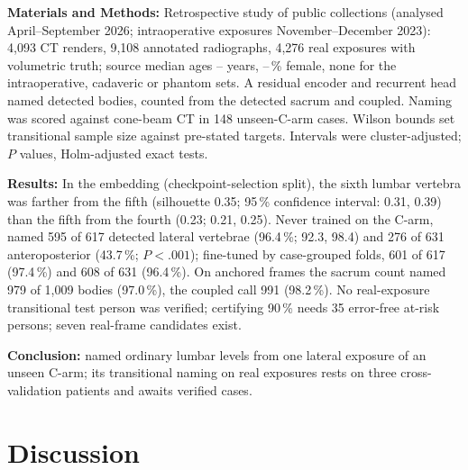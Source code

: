 \textbf{Materials and Methods:} Retrospective study of public collections (analysed April--September 2026; intraoperative exposures November--December 2023): 4,093 CT renders, 9,108 annotated radiographs, 4,276 real exposures with volumetric truth; source median ages -- years, --\,\% female, none for the intraoperative, cadaveric or phantom sets. A residual encoder and recurrent head named detected bodies, counted from the detected sacrum and coupled. Naming was scored against cone-beam CT in 148 unseen-C-arm cases. Wilson bounds set transitional sample size against pre-stated targets. Intervals were cluster-adjusted; $P$ values, Holm-adjusted exact tests.

\textbf{Results:} In the embedding (checkpoint-selection split), the sixth lumbar vertebra was farther from the fifth (silhouette 0.35; 95\,\% confidence interval: 0.31, 0.39) than the fifth from the fourth (0.23; 0.21, 0.25). Never trained on the C-arm, \netname{} named 595 of 617 detected lateral vertebrae (96.4\,\%; 92.3, 98.4) and 276 of 631 anteroposterior (43.7\,\%; $P<.001$); fine-tuned by case-grouped folds, 601 of 617 (97.4\,\%) and 608 of 631 (96.4\,\%). On anchored frames the sacrum count named 979 of 1,009 bodies (97.0\,\%), the coupled call 991 (98.2\,\%). No real-exposure transitional test person was verified; certifying 90\,\% needs 35 error-free at-risk persons; seven real-frame candidates exist.

\textbf{Conclusion:} \netname{} named ordinary lumbar levels from one lateral exposure of an unseen C-arm; its transitional naming on real exposures rests on three cross-validation patients and awaits verified cases.

\clearpage




\section*{Discussion}




